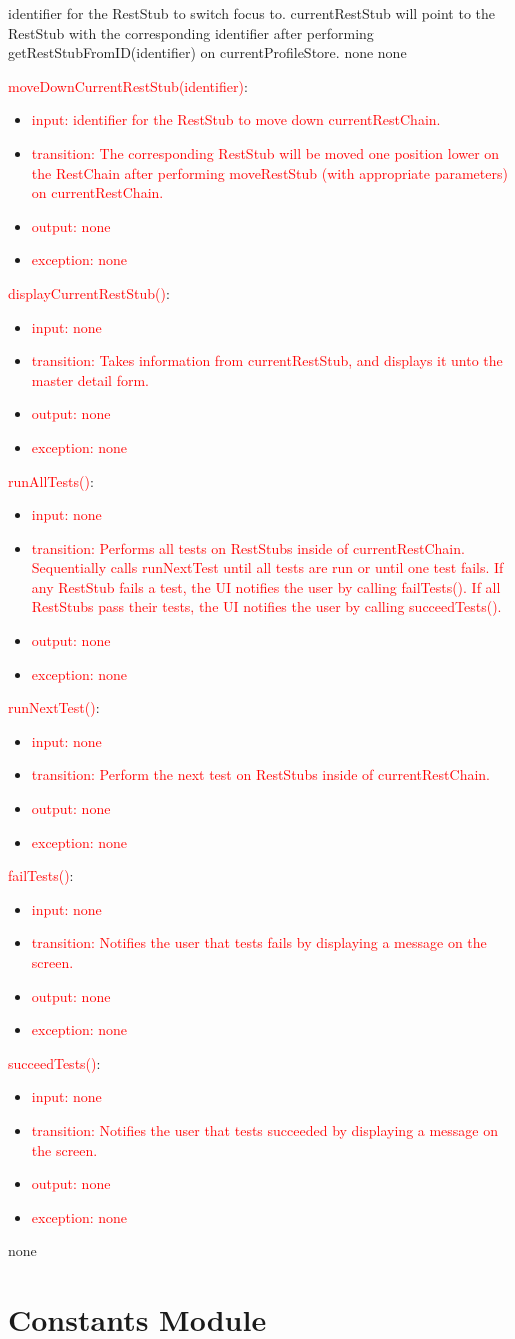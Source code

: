 \documentclass[12pt, titlepage]{article}
\newcommand{\revAccessProgram}[5]{
	\noindent \textcolor{red}{#1}:
		\begin{itemize}
		    \item \textcolor{red}{input: #2}
			\item \textcolor{red}{transition: #3}
			\item \textcolor{red}{output: #4}
			\item \textcolor{red}{exception: #5}
		\end{itemize}
}
\begin{document}
{			{%
				identifier for the RestStub to switch focus to.
			}
			{%
				currentRestStub will point to the RestStub with the corresponding identifier after performing getRestStubFromID(identifier) on currentProfileStore.
			}
			{%
				none
			}
			{%
				none
			}
			\revAccessProgram{moveDownCurrentRestStub(identifier)}
			{%
				identifier for the RestStub to move down currentRestChain.
			}
			{%
				The corresponding RestStub will be moved one position lower on the RestChain after performing moveRestStub (with appropriate parameters) on currentRestChain.
			}
			{%
				none
			}
			{%
				none
			}
			\revAccessProgram{displayCurrentRestStub()}
			{%
				none
			}
			{%
				Takes information from currentRestStub, and displays it unto the master detail form.
			}
			{%
				none
			}
			{%
				none
			}
			\revAccessProgram{runAllTests()}
			{%
				none
			}
			{%
				Performs all tests on RestStubs inside of currentRestChain.
				Sequentially calls runNextTest until all tests are run or until one test fails.
				If any RestStub fails a test, the UI notifies the user by calling failTests().
				If all RestStubs pass their tests, the UI notifies the user by calling succeedTests().
			}
			{%
				none
			}
			{%
				none
			}
			\revAccessProgram{runNextTest()}
			{%
				none
			}
			{%
				Perform the next test on RestStubs inside of currentRestChain.
			}
			{%
				none
			}
			{%
				none
			}
			\revAccessProgram{failTests()}
			{%
				none
			}
			{%
				Notifies the user that tests fails by displaying a message on the screen.
			}
			{%
				none
			}
			{%
				none
			}
			\revAccessProgram{succeedTests()}
			{%
				none
			}
			{%
				Notifies the user that tests succeeded by displaying a message on the screen.
			}
			{%
				none
			}
			{%
				none
			}
	}
	{%
		none
	}
	
\newpage


\section {Constants Module}
\end{document}
